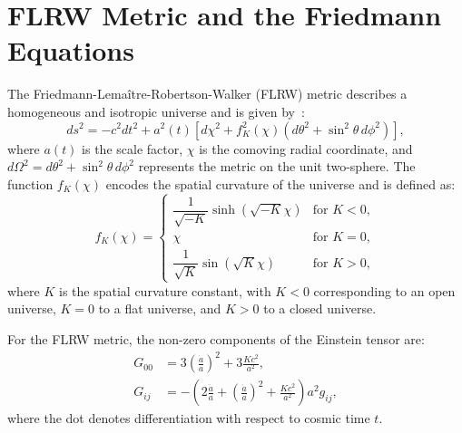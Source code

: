 \section{FLRW Metric and the Friedmann Equations}
\label{sec:flrw_metric}
The Friedmann-Lemaître-Robertson-Walker (FLRW) metric describes a homogeneous and isotropic universe and is given by~\citet{1972gcpa.book.....W}:
\begin{equation}
    ds^2 = -c^2 dt^2 + a^2(t) \left[ d\chi^2 + f_K^2(\chi) \left( d\theta^2 + \sin^2\theta \, d\phi^2 \right) \right],
    \label{eq:flrw_metric}
\end{equation}
where \( a(t) \) is the scale factor, \( \chi \) is the comoving radial coordinate, and \( d\Omega^2 = d\theta^2 + \sin^2\theta \, d\phi^2 \) represents the metric on the unit two-sphere. The function \( f_K(\chi) \) encodes the spatial curvature of the universe and is defined as:
\begin{equation}
    f_K(\chi) = 
    \begin{cases}
        \dfrac{1}{\sqrt{-K}} \sinh\left(\sqrt{-K}\chi\right) & \text{for } K < 0, \\
        \chi & \text{for } K = 0, \\
        \dfrac{1}{\sqrt{K}} \sin\left(\sqrt{K}\chi\right) & \text{for } K > 0,
    \end{cases}
    \label{eq:fk_definition}
\end{equation}
where \( K \) is the spatial curvature constant, with \( K < 0 \) corresponding to an open universe, \( K = 0 \) to a flat universe, and \( K > 0 \) to a closed universe.

For the FLRW metric, the non-zero components of the Einstein tensor are:
\begin{align}
    G_{00} &= 3\left( \frac{\dot{a}}{a} \right)^2 + 3\frac{K c^2}{a^2}, \label{eq:G00_component} \\
    G_{ij} &= -\left( 2\frac{\ddot{a}}{a} + \left( \frac{\dot{a}}{a} \right)^2 + \frac{K c^2}{a^2} \right) a^2 g_{ij}, \label{eq:Gij_component}
\end{align}
where the dot denotes differentiation with respect to cosmic time \( t \).

